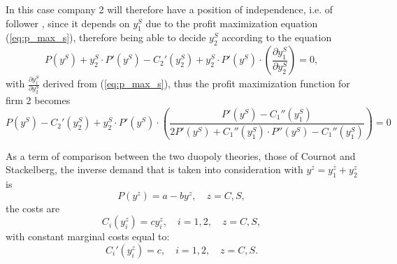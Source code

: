 \documentclass[12pt]{article}
\numberwithin{equation}{subsection}
\begin{document}
In this case company 2 will therefore have a position of independence, i.e. of follower \cite[p. 347]{Wiese_2021},  since it depends on $y^S_1$ due to the profit maximization equation (\ref{eq:p_max_s}), therefore being able to decide $y^S_2$ according to the equation \cite[p. 101]{von_Stackelberg_2011} \begin{equation*}
P(y^S) + y^S_2 \cdot P'(y^S) - C_2'(y^S_2) + y^S_2 \cdot P'(y^S) \cdot \left( \frac{\partial y^S_1}{\partial y^S_2} \right) = 0,
\end{equation*}
with $\frac{\partial y^S_1}{\partial y^S_2}$ derived from (\ref{eq:p_max_s}), thus the profit maximization function for firm 2 becomes \cite[p. 102]{von_Stackelberg_2011} \begin{equation}
\label{eq:max_duo_stack}
P(y^S) - C_2'(y^S_2) + y^S_2 \cdot P'(y^S) \cdot \left( \frac{P'(y^S) - C_1''(y^S_1)}{2P'(y^S) + C_1''(y^S_1) \cdot P''(y^S) - C_1''(y^S_1)} \right) = 0
\end{equation}

As a term of comparison between the two duopoly theories, those of Cournot and Stackelberg, the inverse demand that is taken into consideration with $y^z = y^z_1 + y^z_2$ is \begin{equation}
\label{eq:inv_suppl_sc}
P(y^z) = a - by^z, \quad z = C, S,
\end{equation}
the costs are \begin{equation}
\label{eq:costs_constant}
C_i(y^z_i) = cy^z_i, \quad i = 1,2, \quad z = C,S,
\end{equation}
with constant marginal costs equal to: \begin{equation}
\label{eq:mc_constant}
C_i'(y^z_i) = c, \quad  i = 1,2, \quad z = C,S.
\end{equation}
\end{document}
